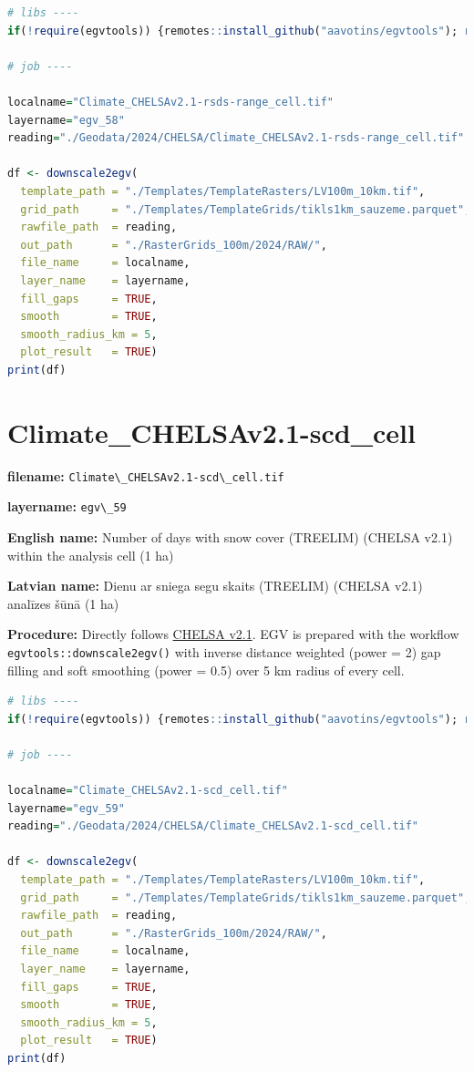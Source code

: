 \documentclass[
]{book}
\newcommand{\passthrough}[1]{#1}
\begin{document}
\begin{lstlisting}[language=R]
# libs ----
if(!require(egvtools)) {remotes::install_github("aavotins/egvtools"); require(egvtools)}

# job ----

localname="Climate_CHELSAv2.1-rsds-range_cell.tif"
layername="egv_58"
reading="./Geodata/2024/CHELSA/Climate_CHELSAv2.1-rsds-range_cell.tif"

df <- downscale2egv(
  template_path = "./Templates/TemplateRasters/LV100m_10km.tif",
  grid_path     = "./Templates/TemplateGrids/tikls1km_sauzeme.parquet",
  rawfile_path  = reading,
  out_path      = "./RasterGrids_100m/2024/RAW/",
  file_name     = localname,
  layer_name    = layername,
  fill_gaps     = TRUE,
  smooth        = TRUE,
  smooth_radius_km = 5,
  plot_result   = TRUE)
print(df)
\end{lstlisting}

\section{Climate\_CHELSAv2.1-scd\_cell}\label{ch06.059}

\textbf{filename:} \passthrough{\lstinline!Climate\_CHELSAv2.1-scd\_cell.tif!}

\textbf{layername:} \passthrough{\lstinline!egv\_59!}

\textbf{English name:} Number of days with snow cover (TREELIM) (CHELSA v2.1) within the analysis cell (1 ha)

\textbf{Latvian name:} Dienu ar sniega segu skaits (TREELIM) (CHELSA v2.1) analīzes šūnā (1 ha)

\textbf{Procedure:} Directly follows \hyperref[Ch04.11]{CHELSA v2.1}. EGV is prepared with the
workflow \passthrough{\lstinline!egvtools::downscale2egv()!} with inverse distance weighted (power = 2)
gap filling and soft smoothing (power = 0.5) over 5 km radius of every cell.

\begin{lstlisting}[language=R]
# libs ----
if(!require(egvtools)) {remotes::install_github("aavotins/egvtools"); require(egvtools)}

# job ----

localname="Climate_CHELSAv2.1-scd_cell.tif"
layername="egv_59"
reading="./Geodata/2024/CHELSA/Climate_CHELSAv2.1-scd_cell.tif"

df <- downscale2egv(
  template_path = "./Templates/TemplateRasters/LV100m_10km.tif",
  grid_path     = "./Templates/TemplateGrids/tikls1km_sauzeme.parquet",
  rawfile_path  = reading,
  out_path      = "./RasterGrids_100m/2024/RAW/",
  file_name     = localname,
  layer_name    = layername,
  fill_gaps     = TRUE,
  smooth        = TRUE,
  smooth_radius_km = 5,
  plot_result   = TRUE)
print(df)
\end{lstlisting}
\end{document}
